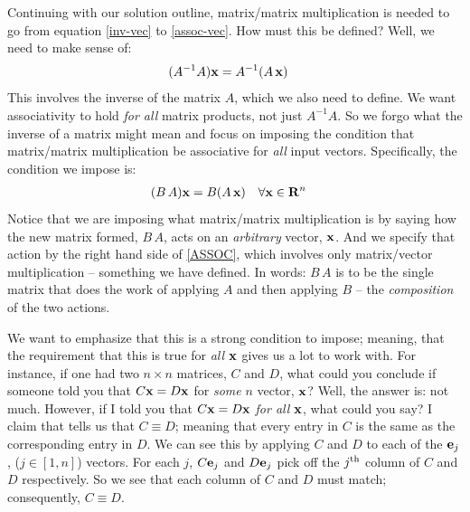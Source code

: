 \documentclass{article}
\begin{document}
Continuing with our solution outline, matrix/matrix multiplication is needed
to go from equation \eqref{inv-vec} to \eqref{assoc-vec}. How must this be defined?
Well, we need to make sense of:
\begin{align}
  (A^{-1} A) {\bf x} &= A^{-1} (A \, {\bf x}) 
\end{align}
This involves the inverse of the matrix $A$, which we also need to define. 
We want associativity to hold {\em for all\/} matrix products, not just $A^{-1} A$.
So we forgo what the inverse of a matrix might mean and focus on imposing the
condition that matrix/matrix multiplication be associative for {\em all\/} input vectors.
Specifically, the condition we impose is:
\begin{align}
	(B\, A) {\bf x} &= B (A \, {\bf x}) \quad \forall {\bf x} \in {\bf R}^n \label{ASSOC}
\end{align}
Notice that we are imposing what matrix/matrix multiplication is by saying how the 
new matrix formed, $B \, A$, acts on an {\em arbitrary\/} vector, ${\bf x}$. And we 
specify that action by the right hand side of \eqref{ASSOC}, which involves only matrix/vector
multiplication -- something we have defined. In words: $B \, A$ is to be the single
matrix that does the work of applying $A$ and then applying $B$ -- the
{\em composition\/} of the two actions.

We want to emphasize that this is a strong condition to impose; meaning, that the 
requirement that this is true for {\em all\/} ${\bf x}$ gives us a lot to work with.
For instance, if one had two $n\times n$ matrices, $C$ and $D$, what could you conclude if someone
told you that $C {\bf x} = D {\bf x}$ for {\em some\/} $n$ vector, ${\bf x}$?
Well, the answer is: not much.
However, if I told you that $C {\bf x} = D {\bf x}$ {\em for all\/} ${\bf x}$, what could you say?
I claim that tells us that $C \equiv D$; meaning that every entry in $C$ is the same as the corresponding
entry in $D$. We can see this by applying $C$ and $D$ to each of the ${\bf e}_j$, ($j \in [1, n]$) vectors.
For each $j$, $C {\bf e}_j$ and $D {\bf e}_j$ pick off the $j^{\rm th}$ column of 
$C$ and $D$ respectively. So we see that each column of $C$ and $D$ must match; consequently,
$C \equiv D$.
\end{document}
